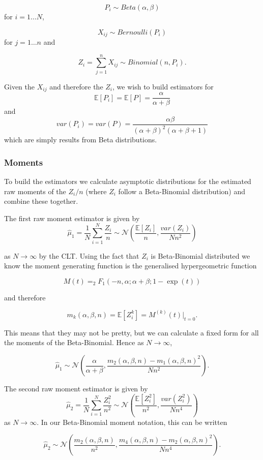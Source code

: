 \documentclass[
10pt, %
a4paper, %
oneside, %
headinclude,footinclude, %
BCOR5mm, %
]{scrartcl}
\begin{document}
$$ P_i \sim Beta(\alpha, \beta) $$
for $i = 1 \dots N$,

$$ X_{ij} \sim Bernoulli(P_i) $$
for $j = 1 \dots n$ and

$$ Z_i = \sum_{j=1}^n X_{ij} \sim Binomial(n, P_i). $$

Given the $X_{ij}$ and therefore the $Z_i$, we wish to build estimators for 
$$\mathbb{E}[P_i] = \mathbb{E}[P] = \frac{\alpha}{\alpha + \beta}$$ 
and 
$$ var(P_i) = var(P) = \frac{\alpha \beta}{(\alpha + \beta)^2 (\alpha + \beta + 1)}$$
which are simply results from Beta distributions.

\subsubsection{Moments}
To build the estimators we calculate asymptotic distributions for the estimated raw moments of the $Z_i/n$ (where $Z_i$ follow a Beta-Binomial distribution) and combine these together.

The first raw moment estimator is given by
$$ \hat{\mu}_1 = \frac{1}{N} \sum_{i=1}^N \frac{Z_i}{n} \sim \mathcal{N} \left( \frac{\mathbb{E}[Z_i]}{n}, \frac{var(Z_i)}{Nn^2} \right )$$

as $N \rightarrow \infty$ by the CLT. Using the fact that $Z_i$ is Beta-Binomial distributed we know the moment generating function is the generalised hypergeometric function

$$ M(t) = _2F_1(-n, \alpha; \alpha + \beta; 1 - \exp(t)) $$

and therefore

$$ m_k(\alpha, \beta, n) = \mathbb{E}[Z_i^k] = M^{(k)}(t)|_{t=0}. $$

This means that they may not be pretty, but we can calculate a fixed form for all the moments of the Beta-Binomial. Hence as $N \rightarrow \infty$,

$$ \hat{\mu}_1 \sim \mathcal{N} \left( \frac{\alpha}{\alpha + \beta}, \frac{m_2(\alpha, \beta, n) - m_1(\alpha, \beta, n)^2}{Nn^2} \right ).$$

The second raw moment estimator is given by
$$ \hat{\mu}_2 = \frac{1}{N} \sum_{i=1}^N \frac{Z_i^2}{n^2} \sim \mathcal{N} \left( \frac{\mathbb{E}[Z_i^2]}{n^2}, \frac{var(Z_i^2)}{Nn^4} \right )$$
as $N \rightarrow \infty$. In our Beta-Binomial moment notation, this can be written

$$ \hat{\mu}_2 \sim \mathcal{N} \left( \frac{m_2(\alpha, \beta, n)}{n^2}, \frac{m_4(\alpha, \beta, n) - m_2(\alpha, \beta, n)^2}{Nn^4} \right ).$$
\end{document}
